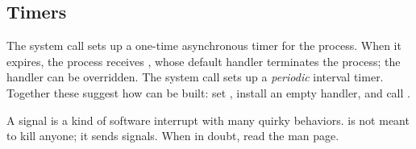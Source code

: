 \subsection{Timers}

The  system call sets up a one-time asynchronous timer for the process. When it expires, the process receives , whose default handler terminates the process; the handler can be overridden. The  system call sets up a \emph{periodic} interval timer. Together these suggest how  can be built: set , install an empty  handler, and call .

\begin{keypoint}[Summary]
  A signal is a kind of software interrupt with many quirky behaviors.  is not meant to kill anyone; it sends signals. When in doubt, read the man page.
\end{keypoint}
